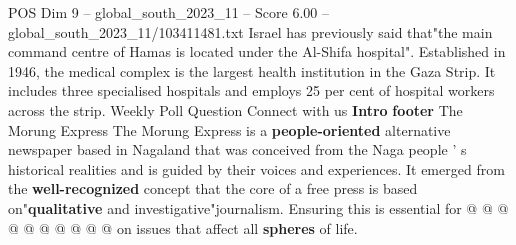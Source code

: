 \begin{textsample}{POS Dim 9 – global\_south\_2023\_11 – Score 6.00 – global\_south\_2023\_11/103411481.txt}
Israel has previously said that"the main command centre of Hamas is located under the Al-Shifa hospital".
Established in 1946, the medical complex is the largest health institution in the Gaza Strip.
It includes three specialised hospitals and employs 25 per cent of hospital workers across the strip.
Weekly Poll Question Connect with us \textbf{Intro} \textbf{footer} The Morung Express The Morung Express is a \textbf{people-oriented} alternative newspaper based in Nagaland that was conceived from the Naga people ' s historical realities and is guided by their voices and experiences.
It emerged from the \textbf{well-recognized} concept that the core of a free press is based on"\textbf{qualitative} and investigative"journalism.
Ensuring this is essential for @ @ @ @ @ @ @ @ @ @ on issues that affect all \textbf{spheres} of life.

\end{textsample}
